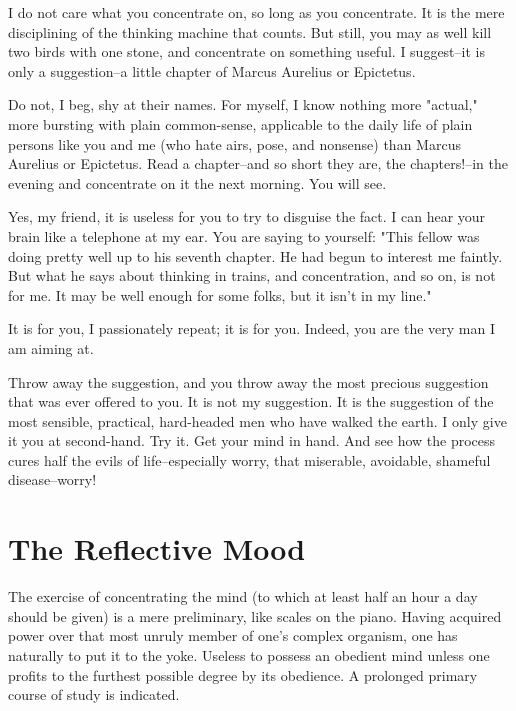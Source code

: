 I do not care what you concentrate on, so long as you concentrate. It
is the mere disciplining of the thinking machine that counts. But
still, you may as well kill two birds with one stone, and concentrate
on something useful.  I suggest--it is only a suggestion--a little
chapter of Marcus Aurelius or Epictetus.

Do not, I beg, shy at their names.  For myself, I know nothing more
"actual," more bursting with plain common-sense, applicable to the
daily life of plain persons like you and me (who hate airs, pose, and
nonsense) than Marcus Aurelius or Epictetus.  Read a chapter--and so
short they are, the chapters!--in the evening and concentrate on it the
next morning.  You will see.

Yes, my friend, it is useless for you to try to disguise the fact. I
can hear your brain like a telephone at my ear.  You are saying to
yourself:  "This fellow was doing pretty well up to his seventh
chapter.  He had begun to interest me faintly.  But what he says about
thinking in trains, and concentration, and so on, is not for me.  It
may be well enough for some folks, but it isn't in my line."

It is for you, I passionately repeat; it is for you.  Indeed, you are
the very man I am aiming at.

Throw away the suggestion, and you throw away the most precious
suggestion that was ever offered to you.  It is not my suggestion. It
is the suggestion of the most sensible, practical, hard-headed men who
have walked the earth.  I only give it you at second-hand. Try it.  Get
your mind in hand.  And see how the process cures half the evils of
life--especially worry, that miserable, avoidable, shameful
disease--worry!


\addtocounter{chapter}{1}\chapter*{The Reflective Mood}

The exercise of concentrating the mind (to which at least half an hour
a day should be given) is a mere preliminary, like scales on the piano.
Having acquired power over that most unruly member of one's complex
organism, one has naturally to put it to the yoke. Useless to possess
an obedient mind unless one profits to the furthest possible degree by
its obedience.  A prolonged primary course of study is indicated.

